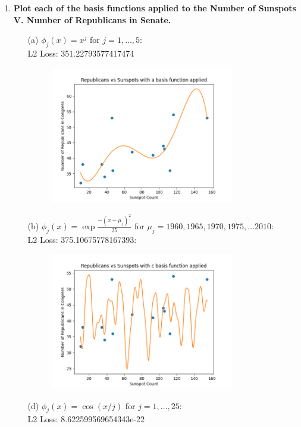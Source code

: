 \documentclass[submit]{harvardml}
\begin{document}
\begin{enumerate}
    \item \textbf{Plot each of the basis functions applied to the Number of Sunspots V. Number of Republicans in Senate.}
    \begin{enumerate}
    	\item[(a)] $\phi_j(x) = x^j$ for $j=1, \ldots, 5$:\\
    	L2 Loss:  351.22793577417474 \\
    	\begin{figure}[H]
            \includegraphics[width=8cm]{hw1/T1P4_plots/plot5.png}
            \centering
        \end{figure}
        \item[(b)] $\phi_j(x) = \exp{\frac{-(x-\mu_j)^2}{25}}$ for $\mu_j=1960, 1965, 1970, 1975, \ldots 2010$: \\
        L2 Loss:  375.10675778167393:\\
        \begin{figure}[H]
            \includegraphics[width=8cm]{hw1/T1P4_plots/plot6.png}
            \centering
        \end{figure}
    	\item[(d)] $\phi_j(x) = \cos(x / j)$ for $j=1, \ldots, 25$: \\
    	L2 Loss:  8.622599569654343e-22 \\
    	\begin{figure}[H]

\end{figure}
\end{enumerate}
\end{enumerate}
\end{document}
